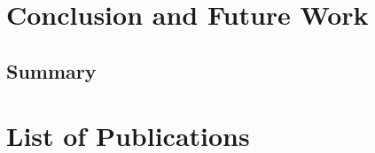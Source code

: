\documentclass[12pt, a4paper, oneside]{Thesis}
\begin{document}
\chapter{Conclusion and Future Work} \label{Chapter10}

\section{Summary}
 

\nocite{*}



 \fancyhead[RE,LO]{\fancyplain{}{\leftmark}}
\renewcommand{\chaptermark}[1]{\markboth{Appendix. \emph{List of Publications}}{}}

\appendix 

\chapter{List of Publications} \label{paper}




 


\backmatter











\cleardoublepage
\end{document}
